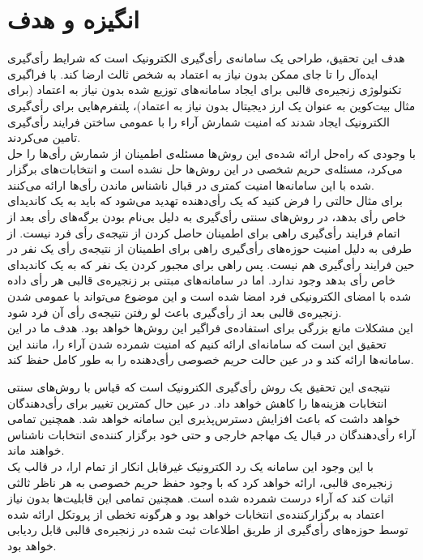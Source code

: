 \section{انگیزه و هدف}
هدف این تحقیق، طراحی یک سامانه‌ی رأی‌گیری الکترونیک است که شرایط رأی‌گیری ایده‌آل را تا جای ممکن بدون نیاز به اعتماد به شخص ثالث ارضا کند. با فراگیری تکنولوژی زنجیره‌ی قالبی برای ایجاد سامانه‌های توزیع شده بدون نیاز به اعتماد (برای مثال بیت‌کوین به عنوان یک‌ ارز دیجیتال بدون نیاز به اعتماد)، پلتفرم‌هایی برای رأی‌گیری الکترونیک ایجاد شدند که امنیت شمارش آراء را با عمومی ساختن فرایند رأی‌گیری تامین می‌کردند. 
\\
با وجودی که راه‌حل ارائه شده‌ی این روش‌ها مسئله‌ی اطمینان از شمارش رأی‌ها را حل می‌کرد، مسئله‌ی حریم شخصی در این روش‌ها حل نشده است و انتخابات‌های برگزار شده با این سامانه‌ها امنیت کمتری در قبال ناشناس ماندن رأی‌ها ارائه می‌کنند. 
\\
برای مثال حالتی را فرض کنید که یک رأی‌دهنده تهدید می‌شود که باید به یک کاندیدای خاص رأی بدهد، در روش‌های سنتی رأی‌گیری به دلیل بی‌نام بودن برگه‌های رأی بعد از اتمام فرایند رأی‌گیری راهی برای اطمینان حاصل کردن از نتیجه‌ی رأی فرد نیست. از طرفی به دلیل امنیت حوزه‌های رأی‌گیری راهی برای اطمینان از نتیجه‌ی رأی یک نفر در حین فرایند رأی‌گیری هم نیست. پس راهی برای مجبور کردن یک نفر که به یک کاندیدای خاص رأی بدهد وجود ندارد. اما در سامانه‌های مبتنی بر زنجیره‌ی قالبی هر رأی داده شده با امضای الکترونیکی فرد امضا شده است و این موضوع می‌تواند با عمومی شدن زنجیره‌ی قالبی بعد از رأی‌گیری باعث لو رفتن نتیجه‌ی رأی آن فرد شود.
\\
این مشکلات مانع بزرگی برای استفاده‌ی فراگیر این روش‌ها خواهد بود. هدف ما در این تحقیق این است که سامانه‌ای ارائه کنیم که امنیت شمرده شدن آراء را، مانند این سامانه‌ها ارائه کند و در عین حالت حریم خصوصی رأی‌دهنده را به طور کامل حفظ کند. 
\par
نتیجه‌ی این تحقیق یک روش‌ رأی‌گیری الکترونیک است که قیاس با روش‌های سنتی انتخابات هزینه‌ها را کاهش خواهد داد. در عین حال کمترین تغییر برای رأی‌دهندگان خواهد داشت که باعث افزایش دسترس‌پذیری این سامانه خواهد شد. همچنین تمامی آراء رأی‌دهندگان در قبال یک مهاجم خارجی و حتی خود برگزار کننده‌ی انتخابات ناشناس خواهند ماند. 
\\
با این وجود این سامانه یک رد الکترونیک غیرقابل انکار از تمام ارا، در قالب یک زنجیره‌ی قالبی، ارائه ‌خواهد کرد که با وجود حفظ حریم خصوصی به هر ناظر ثالثی اثبات کند که آراء درست شمرده شده است. همچنین تمامی این قابلیت‌ها بدون نیاز اعتماد به برگزارکننده‌ی انتخابات خواهد بود و هرگونه تخطی از پروتکل ارائه شده توسط حوزه‌های رأی‌گیری از طریق اطلاعات ثبت شده در زنجیره‌ی قالبی قابل ردیابی خواهد بود.








